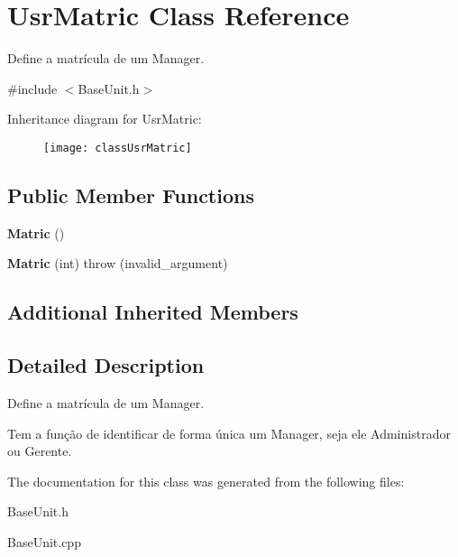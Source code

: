 \hypertarget{classUsrMatric}{\section{Usr\-Matric Class Reference}
\label{classUsrMatric}
}


Define a matrícula de um Manager.  




{\ttfamily \#include $<$Base\-Unit.\-h$>$}

Inheritance diagram for Usr\-Matric\-:\begin{figure}[H]
\begin{center}
\leavevmode
\texttt{[image: classUsrMatric]}
\end{center}
\end{figure}
\subsection*{Public Member Functions}
\begin{DoxyCompactItemize}
\item 
\hypertarget{classUsrMatric_a62732ab82c25990f4e37ad7575760630}{{\bfseries Matric} ()}\label{classUsrMatric_a62732ab82c25990f4e37ad7575760630}

\item 
\hypertarget{classUsrMatric_a986f012bd822779ed3a256dddfd26581}{{\bfseries Matric} (int)  throw (invalid\-\_\-argument)}\label{classUsrMatric_a986f012bd822779ed3a256dddfd26581}

\end{DoxyCompactItemize}
\subsection*{Additional Inherited Members}


\subsection{Detailed Description}
Define a matrícula de um Manager. 

Tem a função de identificar de forma única um Manager, seja ele Administrador ou Gerente. 

The documentation for this class was generated from the following files\-:\begin{DoxyCompactItemize}
\item 
Base\-Unit.\-h\item 
Base\-Unit.\-cpp\end{DoxyCompactItemize}
